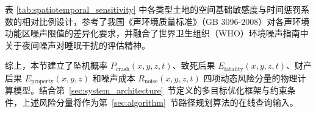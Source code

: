 表 \ref{tab:spatiotemporal_sensitivity} 中各类型土地的空间基础敏感度与时间惩罚系数的相对比例设计，参考了我国《声环境质量标准》（GB 3096-2008）对各声环境功能区噪声限值的差异化要求，并融合了世界卫生组织（WHO）环境噪声指南中关于夜间噪声对睡眠干扰的评估精神。

综上，本节建立了坠机概率 $P_{\mathrm{crash}}(x,y,z,t)$、致死后果 $E_{\mathrm{fatality}}(x,y,z,t)$、财产后果 $E_{\mathrm{property}}(x,y,z)$ 和噪声成本 $R_{\mathrm{noise}}(x,y,z,t)$ 四项动态风险分量的物理计算模型。结合第~\ref{sec:system_architecture}~节定义的多目标优化框架与约束条件，上述风险分量将作为第~\ref{sec:algorithm}~节路径规划算法的在线查询输入。
